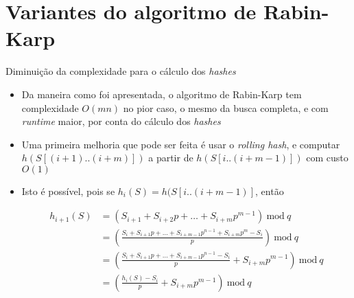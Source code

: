 \section{Variantes do algoritmo de Rabin-Karp}

\begin{frame}[fragile]{Diminuição da complexidade para o cálculo dos {\it hashes}}

    \begin{itemize}
        \item  Da maneira como foi apresentada, o algoritmo de Rabin-Karp tem complexidade 
            $O(mn)$ no pior caso, o mesmo da busca completa, e com \textit{runtime} maior,
            por conta do cálculo dos \textit{hashes}
        \pause

        \item Uma primeira melhoria que pode ser feita é usar o \textit{rolling hash}, e computar
            $h(S[(i+1)..(i+m)])$ a partir de $h(S[i..(i + m -1)])$ com custo $O(1)$
        \pause

        \item Isto é possível, pois se $h_i(S) = h(S[i..(i + m - 1)]$, então
        \begin{small}
        \begin{align*}
            h_{i + 1}(S)
            &= \left(S_{i+1} + S_{i + 2}p + \ldots + S_{i+m}p^{m - 1}\right)\ \mbox{mod}\ q \\
            &= \left(\frac{S_i + S_{i+1}p + \ldots + S_{i+m-1}p^{n - 1} + S_{i+m}p^m - S_i}{p} \right)\ \mbox{mod}\ q \\
            &= \left(\frac{S_i + S_{i+1}p + \ldots + S_{i+m-1}p^{n - 1} - S_i}{p} + S_{i+m}p^{m -1} \right)\ \mbox{mod}\ q \\
            &= \left(\frac{h_i(S) - S_i}{p} + S_{i+m}p^{m -1}\right)\ \mbox{mod}\ q 
        \end{align*}
        \end{small}
         
    \end{itemize}

\end{frame}

